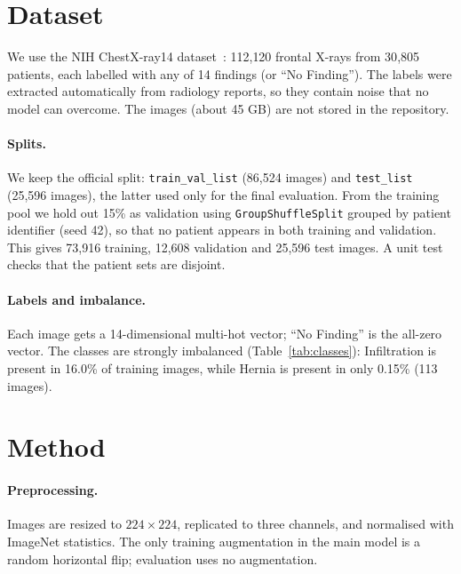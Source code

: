 \documentclass[11pt,a4paper]{article}
\begin{document}
\section{Dataset}
We use the NIH ChestX-ray14 dataset~\cite{wang2017chestxray}: 112{,}120 frontal X-rays from 30{,}805 patients, each labelled with any of 14 findings (or ``No Finding''). The labels were extracted automatically from radiology reports, so they contain noise that no model can overcome. The images (about 45 GB) are not stored in the repository.

\paragraph{Splits.} We keep the official split: \texttt{train\_val\_list} (86{,}524 images) and \texttt{test\_list} (25{,}596 images), the latter used only for the final evaluation. From the training pool we hold out 15\% as validation using \texttt{GroupShuffleSplit} grouped by patient identifier (seed 42), so that no patient appears in both training and validation. This gives 73{,}916 training, 12{,}608 validation and 25{,}596 test images. A unit test checks that the patient sets are disjoint.

\paragraph{Labels and imbalance.} Each image gets a 14-dimensional multi-hot vector; ``No Finding'' is the all-zero vector. The classes are strongly imbalanced (Table~\ref{tab:classes}): Infiltration is present in 16.0\% of training images, while Hernia is present in only 0.15\% (113 images).

\begin{table}[htbp]
\centering

\caption{Per-class training prevalence, loss weight and test AUC. The loss weight is the ratio of negatives to positives in the training split.}
\label{tab:classes}
\end{table}

\section{Method}
\paragraph{Preprocessing.} Images are resized to $224\times224$, replicated to three channels, and normalised with ImageNet statistics. The only training augmentation in the main model is a random horizontal flip; evaluation uses no augmentation.
\end{document}
